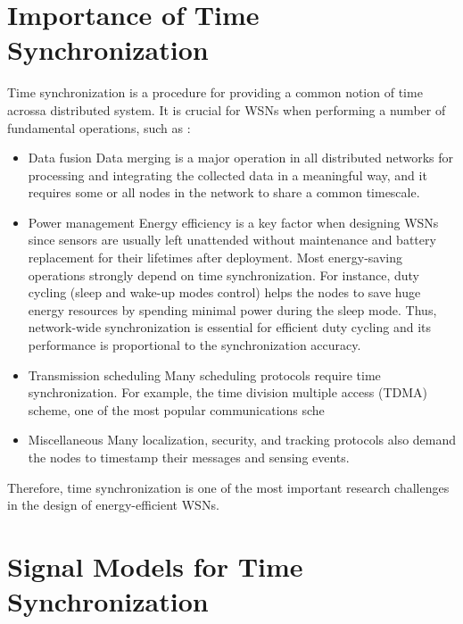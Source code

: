 \section{Importance of Time Synchronization}
    Time synchronization is a procedure for providing a common notion of time acrossa distributed system. It is crucial for WSNs when performing a number of fundamental operations, such as \cite{book}:
    \begin{itemize}
        \item Data fusion Data merging is a major operation in all distributed networks for processing and integrating the collected data in a meaningful way, and it requires some or all nodes in the network to share a common timescale.
        \item Power management Energy efficiency is a key factor when designing WSNs since sensors are usually left unattended without maintenance and battery replacement for their lifetimes after deployment. Most energy-saving operations strongly depend on time synchronization. For instance, duty cycling (sleep and wake-up modes control) helps the nodes to save huge energy resources by spending minimal power during the sleep mode. Thus, network-wide synchronization is essential for efficient duty cycling and its performance is proportional to the synchronization accuracy.
        \item Transmission scheduling Many scheduling protocols require time synchronization. For example, the time division multiple access (TDMA) scheme, one of the most popular communications sche
        \item Miscellaneous Many localization, security, and tracking protocols also demand the nodes to timestamp their messages and sensing events.
    \end{itemize}
    Therefore, time synchronization is one of the most important research challenges in the design of energy-efficient WSNs.
    
\section{Signal Models for Time Synchronization}
